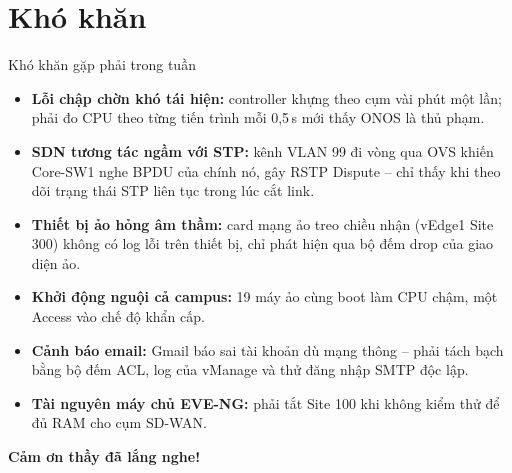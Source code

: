 \documentclass[aspectratio=169, 10pt]{beamer}
\begin{document}
\section{Khó khăn}

\begin{frame}{Khó khăn gặp phải trong tuần}
    \small
    \begin{itemize}
        \item \textbf{Lỗi chập chờn khó tái hiện:} controller khựng theo cụm vài phút một lần; phải đo CPU
              theo từng tiến trình mỗi 0,5\,s mới thấy ONOS là thủ phạm.
        \item \textbf{SDN tương tác ngầm với STP:} kênh VLAN 99 đi vòng qua OVS khiến Core-SW1 nghe BPDU của
              chính nó, gây RSTP Dispute -- chỉ thấy khi theo dõi trạng thái STP liên tục trong lúc cắt link.
        \item \textbf{Thiết bị ảo hỏng âm thầm:} card mạng ảo treo chiều nhận (vEdge1 Site 300) không có log lỗi
              trên thiết bị, chỉ phát hiện qua bộ đếm drop của giao diện ảo.
        \item \textbf{Khởi động nguội cả campus:} 19 máy ảo cùng boot làm CPU chậm, một Access vào chế độ khẩn cấp.
        \item \textbf{Cảnh báo email:} Gmail báo sai tài khoản dù mạng thông -- phải tách bạch bằng bộ đếm ACL,
              log của vManage và thử đăng nhập SMTP độc lập.
        \item \textbf{Tài nguyên máy chủ EVE-NG:} phải tắt Site 100 khi không kiểm thử để đủ RAM cho cụm SD-WAN.
    \end{itemize}
\end{frame}

\begin{frame}[plain]
    \centering
    \vfill
    {\Huge\color{primaryDark}\textbf{Cảm ơn thầy đã lắng nghe!}}
    \vfill
\end{frame}
\end{document}
